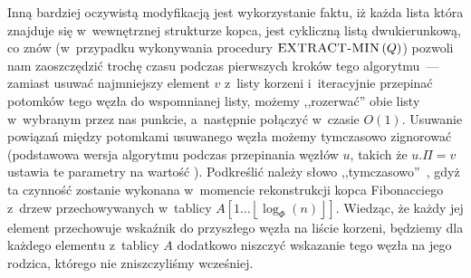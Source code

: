 Inną bardziej oczywistą modyfikacją jest wykorzystanie faktu, iż każda lista która znajduje się w~wewnętrznej strukturze kopca, jest cykliczną listą dwukierunkową, co znów (w~przypadku wykonywania procedury $\textrm{\textsc{EXTRACT-MIN}} \left( Q \right)$) pozwoli nam zaoszczędzić trochę czasu podczas pierwszych kroków tego algorytmu~--- zamiast usuwać najmniejszy element $v$ z~listy korzeni i~iteracyjnie przepinać potomków tego węzła do wspomnianej listy, możemy ,,rozerwać'' obie listy w~wybranym przez nas punkcie, a~następnie połączyć w~czasie $O \left( 1 \right)$.
Usuwanie powiązań między potomkami usuwanego węzła możemy tymczasowo zignorować (podstawowa wersja algorytmu podczas przepinania węzłów $u$, takich że $u.\Pi = v$ ustawia te parametry na wartość \KwNull).
Podkreślić należy słowo ,,tymczasowo''~, gdyż ta czynność zostanie wykonana w~momencie rekonstrukcji kopca Fibonacciego z~drzew przechowywanych w~tablicy $A \left[ 1 \dots \left \lfloor \log_{\Phi} \left( n \right) \right \rfloor \right]$. Wiedząc, że każdy jej element przechowuje wskaźnik do przyszłego węzła na liście korzeni, będziemy dla każdego elementu z~tablicy $A$ dodatkowo niszczyć wskazanie tego węzła na jego rodzica, którego nie zniszczyliśmy wcześniej.

